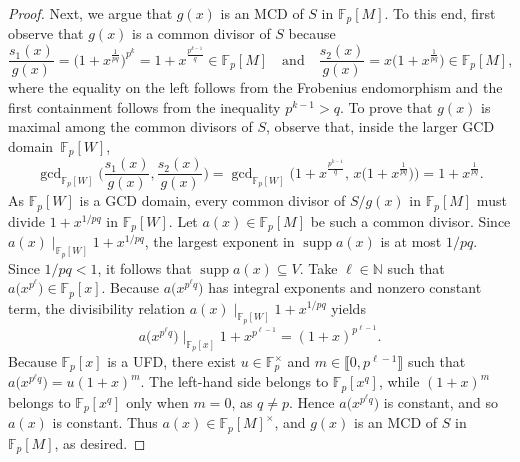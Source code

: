 \documentclass[10pt]{amsart}
\theoremstyle{definition}
\theoremstyle{remark}
\numberwithin{equation}{section}
\newcommand{\ff}{\mathbb{F}}
\newcommand{\nn}{\mathbb{N}}
\providecommand\ldb{\llbracket}
\providecommand\rdb{\rrbracket}
\begin{document}
\begin{proof}
  Next, we argue that $g(x)$ is an MCD of $S$ in $\ff_p[M]$. To this end, first observe that $g(x)$ is a common divisor of $S$ because
  \[
    \frac{s_1(x)}{g(x)} = \big( 1+x^{\frac1{pq}} \big)^{p^k} = 1 + x^{\frac{p^{k-1}}{q}} \in \ff_p[M] \quad \text{and} \quad \frac{s_2(x)}{g(x)} = x\big(1+x^{\frac1{pq}}\big) \in \ff_p[M],
  \]
  where the equality on the left follows from the Frobenius endomorphism and the first containment follows from the inequality $p^{k-1} > q$. To prove that $g(x)$ is maximal among the common divisors of $S$, observe that, inside the larger GCD domain~$\ff_p[W]$,
  \[
    \gcd\nolimits_{\ff_p[W]} \bigg( \frac{s_1(x)}{g(x)}, \frac{s_2(x)}{g(x)} \bigg) = \gcd\nolimits_{\ff_p[W]}\Big( 1 + x^{\frac{p^{k-1}}{q}}, \, x\big(1+x^{\frac{1}{pq}} \big)\Big) = 1 + x^{\frac{1}{pq}}.
  \]
  As $\ff_p[W]$ is a GCD domain, every common divisor of $S/g(x)$ in $\ff_p[M]$ must divide $1+x^{1/pq}$ in $\ff_p[W]$. Let $a(x) \in \ff_p[M]$ be such a common divisor. Since $a(x) \mid_{\ff_p[W]} 1+x^{1/pq}$, the largest exponent in $\operatorname{supp} a(x)$ is at most $1/pq$. Since $1/pq<1$, it follows that $\operatorname{supp} a(x) \subseteq V$. Take $\ell \in \nn$ such that $a\big(x^{p^\ell}\big) \in \ff_p[x]$. Because $a\big(x^{p^\ell q}\big)$ has integral exponents and nonzero constant term, the divisibility relation $a(x) \mid_{\ff_p[W]} 1+x^{1/pq}$ yields
  \[
    a\big(x^{p^\ell q}\big) \mid_{\ff_p[x]} 1+x^{p^{\ell-1}}=(1+x)^{p^{\ell-1}}.
  \]
  Because $\ff_p[x]$ is a UFD, there exist $u \in \ff_p^\times$ and $m \in \ldb 0,p^{\ell-1} \rdb$ such that $a\big(x^{p^\ell q}\big)=u(1+x)^m$. The left-hand side belongs to $\ff_p[x^q]$, while $(1+x)^m$ belongs to $\ff_p[x^q]$ only when $m=0$, as $q \neq p$. Hence $a\big(x^{p^\ell q}\big)$ is constant, and so $a(x)$ is constant. Thus $a(x) \in \ff_p[M]^\times$, and $g(x)$ is an MCD of $S$ in $\ff_p[M]$, as desired.


\end{proof}
\end{document}
